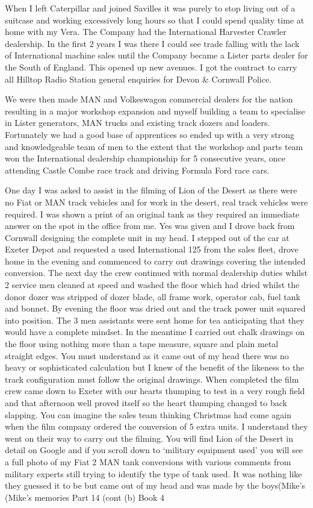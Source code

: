 When I left Caterpillar and joined Savilles it was purely to stop living out of
a suitcase and working excessively long hours so that I could spend quality
time at home with my Vera.  The Company had the International Harvester Crawler
dealership.  In the first 2 years I was there I could see trade falling with
the lack of International machine sales until the Company became a Lister parts
dealer for the South of England.  This opened up new avenues.  I got the
contract to carry all Hilltop Radio Station general enquiries for Devon \&
Cornwall Police.

We were then made MAN and Volkeswagon commercial dealers for the nation
resulting in a major workshop expansion and myself building a team to
specialise in Lister generators, MAN trucks and existing track dozers and
loaders.  Fortunately we had a good base of apprentices so ended up with a very
strong and knowledgeable team of men to the extent that the workshop and parts
team won the International dealership championship for 5 consecutive years,
once attending Castle Combe race track and driving Formula Ford race cars.

One day I was asked to assist in the filming of Lion of the Desert as there were
no Fiat or MAN track vehicles and for work in the desert, real track vehicles
were required.  I was shown a print of an original tank as they required an
immediate answer on the spot in the office from me.  Yes was given and I drove
back from Cornwall designing the complete unit in my head.  I stepped out of
the car at Exeter Depot and requested a used International 125 from the sales
fleet, drove home in the evening and commenced to carry out drawings covering
the intended conversion.  The next day the crew continued with normal
dealership duties whilst 2 service men cleaned at speed and washed the floor
which had dried whilst the donor dozer was stripped of dozer blade, all frame
work, operator cab, fuel tank and bonnet.  By evening the floor was dried out
and the track power unit squared into position.  The 3 men assistants were sent
home for tea anticipating that they would have a complete mindset.  In the
meantime I carried out chalk drawings on the floor using nothing more than a
tape measure, square and plain metal straight edges.  You must understand as it
came out of my head there was no heavy or sophisticated calculation but I knew
of the benefit of the likeness to the track configuration must follow the
original drawings.  When completed the film crew came down to Exeter with our
hearts thumping to test in a very rough field and that afternoon well proved
itself so the heart thumping changed to back slapping.  You can imagine the
sales team thinking Christmas had come again when the film company ordered the
conversion of 5 extra units.  I understand they went on their way to carry out
the filming.  You will find Lion of the Desert in detail on Google and if you
scroll down to ‘military equipment used' you will see a full photo of my Fiat 2
MAN tank conversions with various comments from military experts still trying
to identify the type of tank used.  It was nothing like they guessed it to be
but came out of my head and was made by the boys(Mike's (Mike's memories Part
14 (cont (b) Book 4

